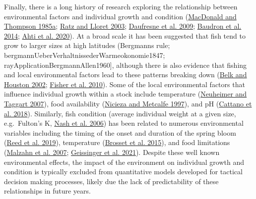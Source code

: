 \documentclass[
]{article}
\begin{document}
Finally, there is a long history of research exploring the relationship between environmental factors and individual growth and condition (\protect\hyperlink{ref-macdonaldInfluenceTemperatureFood1985a}{MacDonald and Thompson 1985a}; \protect\hyperlink{ref-ratzVariationFishCondition2003a}{Ratz and Lloret 2003}; \protect\hyperlink{ref-daufresneGlobalWarmingBenefits2009}{Daufresne et al. 2009}; \protect\hyperlink{ref-baudronWarmingTemperaturesSmaller2014}{Baudron et al. 2014}; \protect\hyperlink{ref-ahtiSizeDoesMatter2020}{Ahti et al. 2020}). At a broad scale it has been suggested that fish tend to grow to larger sizes at high latitudes (Bergmanns rule; bergmannUeberVerhaltnissederWarmeokonomie1847; rayApplicationBergmannAllen1960{]}, although there is also evidence that fishing and local environmental factors lead to these patterns breaking down (\protect\hyperlink{ref-belkBergmannRuleEctotherms2002}{Belk and Houston 2002}; \protect\hyperlink{ref-fisherBreakingBergmannRule2010}{Fisher et al. 2010}). Some of the local environmental factors that influence individual growth within a stock include temperature (\protect\hyperlink{ref-neuheimerGrowingDegreedayFish2007}{Neuheimer and Taggart 2007}), food availability (\protect\hyperlink{ref-niciezaGrowthCompensationJuvenile1997}{Nicieza and Metcalfe 1997}), and pH (\protect\hyperlink{ref-cattanoLivingHighCO22018}{Cattano et al. 2018}). Similarly, fish condition (average individual weight at a given size, e.g.~Fulton's K, \protect\hyperlink{ref-nashOriginFultonCondition2006}{Nash et al. 2006}) has been related to numerous environmental variables including the timing of the onset and duration of the spring bloom (\protect\hyperlink{ref-reedResponseScotianShelf2019}{Reed et al. 2019}), temperature (\protect\hyperlink{ref-brossetInfluenceEnvironmentalVariability2015}{Brosset et al. 2015}), and food limitations (\protect\hyperlink{ref-malzahnNutrientLimitationPrimary2007}{Malzahn et al. 2007}; \protect\hyperlink{ref-geissingerFoodInitialSize2021}{Geissinger et al. 2021}). Despite these well known environmental effects, the impact of the environment on individual growth and condition is typically excluded from quantitative models developed for tactical decision making processes, likely due the lack of predictability of these relationships in future years.
\end{document}

